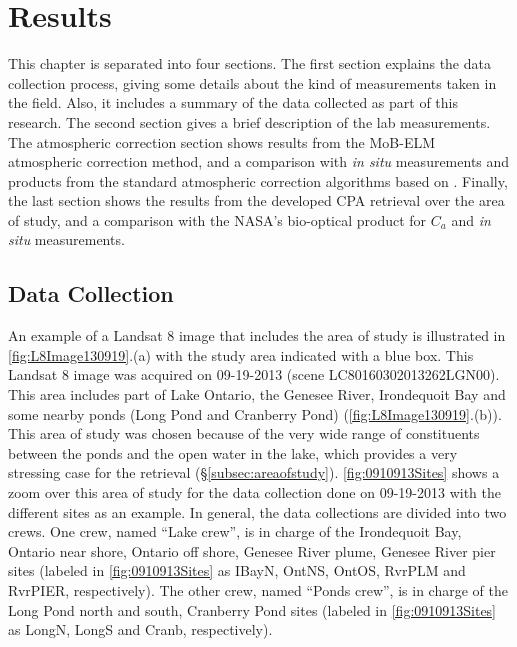 \chapter{Results}
\label{ch:results}
This chapter is separated into four sections. The first section explains the data collection process, giving some details about the kind of measurements taken in the field. Also, it includes a summary of the data collected as part of this research. The second section gives a brief description of the lab measurements. The atmospheric correction section shows results from the MoB-ELM atmospheric correction method, and a comparison with {\it in situ} measurements and products from the standard atmospheric correction algorithms based on \cite{Gordon:1994}. Finally, the last section shows the results from the developed CPA retrieval over the area of study, and a comparison with the NASA's bio-optical product for $C_a$ and {\it in situ} measurements.
\section{Data Collection}
An example of a Landsat 8 image that includes the area of study is illustrated in \autoref{fig:L8Image130919}.(a) with the study area indicated with a blue box. This Landsat 8 image was acquired on 09-19-2013 (scene LC80160302013262LGN00). This area includes part of Lake Ontario, the Genesee River, Irondequoit Bay and some nearby ponds (Long Pond and Cranberry Pond) (\autoref{fig:L8Image130919}.(b)). This area of study was chosen because of the very wide range of constituents between the ponds and the open water in the lake, which provides a very stressing case for the retrieval (\S\ref{subsec:areaofstudy}). \autoref{fig:0910913Sites} shows a zoom over this area of study for the data collection done on 09-19-2013  with the different sites as an example. In general, the data collections are divided into two crews. One crew, named ``Lake crew'', is in charge of the Irondequoit Bay, Ontario near shore, Ontario off shore, Genesee River plume, Genesee River pier sites (labeled in \autoref{fig:0910913Sites} as IBayN, OntNS, OntOS, RvrPLM and RvrPIER, respectively). The other crew, named ``Ponds crew'', is in charge of the Long Pond north and south, Cranberry Pond sites (labeled in \autoref{fig:0910913Sites} as LongN, LongS and Cranb, respectively).

